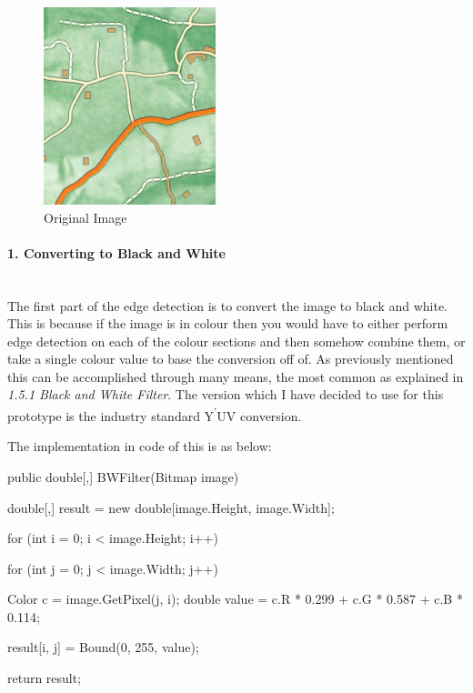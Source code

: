 \begin{flushleft}
        \begin{figure}[H]
            \centering
            \includegraphics[width=5cm]{images/edgeDetectionPrototype/in.jpg}
            \caption{Original Image}
            \label{fig:proto_original}
        \end{figure}
        
        \paragraph{1. Converting to Black and White} \mbox{} \\
        The first part of the edge detection is to convert the image to black and white. This is because if the image is in colour then you would have to either perform edge detection on each of the colour sections and then somehow combine them, or take a single colour value to base the conversion off of. As previously mentioned this can be accomplished through many means, the most common as explained in \textit{1.5.1 Black and White Filter}. The version which I have decided to use for this prototype is the industry standard Y\textsuperscript{'}UV conversion. \\ \bk
        
        The implementation in code of this is as below:
        \begin{cscode}
public double[,] BWFilter(Bitmap image)
{
    double[,] result = new double[image.Height, image.Width];

    for (int i = 0; i < image.Height; i++)
    {
        for (int j = 0; j < image.Width; j++)
        {
            Color c = image.GetPixel(j, i);
            double value = c.R * 0.299 + c.G * 0.587 + c.B * 0.114;

            result[i, j] = Bound(0, 255, value);
        }
    }

    return result;
}
        \end{cscode}
        

\end{flushleft}
